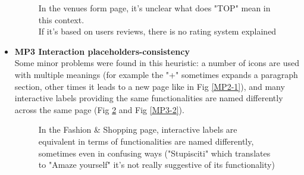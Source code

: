 \begin{itemize}
\begin{figure}[!ht]
\begin{minipage}{\linewidth}
                \captionsetup{justification=centering}
                \caption{In the venues form page, it's unclear what does "TOP" mean in this context.\\If it's based on users reviews, there is no rating system explained}
                \label{MP2-2}
            \end{minipage}
        \end{figure}
    \item \textbf{MP3 Interaction placeholders-consistency}\\
        Some minor problems were found in this heuristic:
        a number of icons are used with multiple meanings (for example the "+" sometimes expands a paragraph section, other times it leads to a new page like in Fig \ref{MP2-1}), and many interactive labels providing the same functionalities are named differently across the same page (Fig \ref{MP3-1} and Fig \ref{MP3-2}).
        \begin{figure}[!ht]
            \begin{minipage}{\linewidth}
                \centering
                \captionsetup{justification=centering}
                \caption{In the Fashion \& Shopping page, interactive labels are equivalent in terms of functionalities are named differently, sometimes even in confusing ways ("Stupisciti" which translates to "Amaze yourself" it's not really suggestive of its functionality)}
                \label{MP3-1}
            \end{minipage}
        \end{figure}
        \begin{figure}[!ht]
            \begin{minipage}{\linewidth}
                \centering

\end{minipage}
\end{figure}
\end{itemize}
